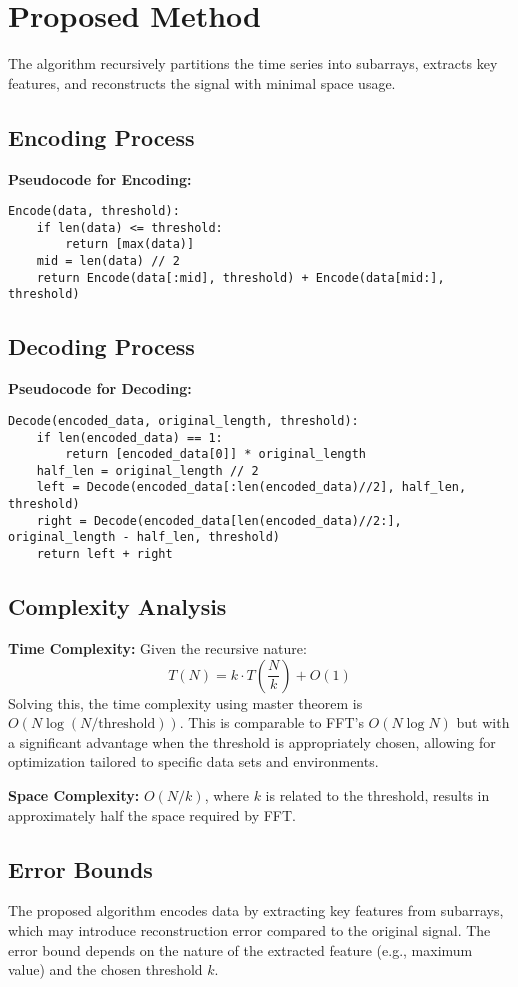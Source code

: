 \documentclass[conference]{IEEEtran}
\begin{document}
\section{Proposed Method}
The algorithm recursively partitions the time series into subarrays, extracts key features, and reconstructs the signal with minimal space usage.

\subsection{Encoding Process}
\textbf{Pseudocode for Encoding:}
\begin{verbatim}
Encode(data, threshold):
    if len(data) <= threshold:
        return [max(data)]
    mid = len(data) // 2
    return Encode(data[:mid], threshold) + Encode(data[mid:], threshold)
\end{verbatim}

\subsection{Decoding Process}
\textbf{Pseudocode for Decoding:}
\begin{verbatim}
Decode(encoded_data, original_length, threshold):
    if len(encoded_data) == 1:
        return [encoded_data[0]] * original_length
    half_len = original_length // 2
    left = Decode(encoded_data[:len(encoded_data)//2], half_len, threshold)
    right = Decode(encoded_data[len(encoded_data)//2:], original_length - half_len, threshold)
    return left + right
\end{verbatim}

\subsection{Complexity Analysis}
\textbf{Time Complexity:} Given the recursive nature:
\[
T(N) = k \cdot T\left(\frac{N}{k}\right) + O(1)
\]
Solving this, the time complexity using master theorem is \( O(N \log(N/\text{threshold})) \). This is comparable to FFT's \( O(N \log N) \) but with a significant advantage when the threshold is appropriately chosen, allowing for optimization tailored to specific data sets and environments.

\textbf{Space Complexity:} \( O(N/k) \), where \( k \) is related to the threshold, results in approximately half the space required by FFT.

\subsection{Error Bounds}
The proposed algorithm encodes data by extracting key features from subarrays, which may introduce reconstruction error compared to the original signal. The error bound depends on the nature of the extracted feature (e.g., maximum value) and the chosen threshold \( k \).
\end{document}
